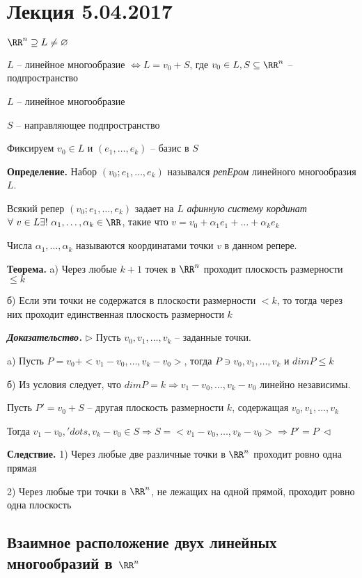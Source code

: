 \section{Лекция 5.04.2017}

$\RR^n \supseteq L \neq \varnothing$

$L$ -- линейное многообразие $\Leftrightarrow L = v_0 + S$, где $v_0 \in L, S \subseteq \RR^n$ -- подпространство

\bigskip
$L$ -- линейное многообразие

$S$ -- направляющее подпространство

Фиксируем $v_0 \in L$ и $(e_1, \dots, e_k)$ -- базис в $S$

\bigskip
\textbf{Определение.} Набор $(v_0; e_1, \dots, e_k)$ назывался \textit{репЕром} линейного многообразия $L$.

\bigskip
Всякий репер $(v_0; e_1, \dots, e_k)$ задает на $L$ \textit{афинную систему кординат} $\forall \ v \in L \exists! \ \alpha_1, \dots, \alpha_k \in \RR$, такие что $v = v_0 + \alpha_1 e_1 + \dots + \alpha_k e_k$

\bigskip
Числа $\alpha_1, \dots, \alpha_k$ называются координатами точки $v$ в данном репере.

\bigskip
\textbf{Теорема.} a) Через любые $k+1$ точек в $\RR^n$ проходит плоскость размерности $\leq k$

б) Если эти точки не содержатся в плоскости размерности $<k$, то тогда через них проходит единственная плоскость размерности $k$

\bigskip
\textbf{\textit{Доказательство.}} $\rhd$ Пусть $v_0, v_1, \dots, v_k$ -- заданные точки. 

a) Пусть $P = v_0 + <v_1 - v_0, \dots, v_k - v_0>$, тогда $P \ni v_0, v_1, \dots, v_k$ и $dimP \leq k$

б) Из условия следует, что $dimP = k \Rightarrow v_1 - v_0, \dots, v_k - v_0$ линейно независимы.

Пусть $P' = v_0 + S$ -- другая плоскость размерности $k$, содержащая $v_0, v_1, \dots, v_k$

Тогда $v_1 - v_0, 'dots, v_k - v_0 \in S \Rightarrow S = <v_1 - v_0, \dots, v_k - v_0> \Rightarrow P' = P \ \lhd$

\bigskip
\textbf{Следствие.} 1) Через любые две различные точки в $\RR^n$ проходит ровно одна прямая

2) Через любые три точки в $\RR^n$, не лежащих на одной прямой, проходит ровно одна плоскость

\subsection{Взаимное расположение двух линейных многообразий в $\RR^n$}

